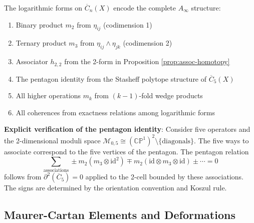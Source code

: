 \begin{theorem}\label{thm:homotopy-complete}
The logarithmic forms on $\overline{C}_n(X)$ encode the complete $A_\infty$ structure:
\begin{enumerate}
\item Binary product $m_2$ from $\eta_{ij}$ (codimension 1)
\item Ternary product $m_3$ from $\eta_{ij} \wedge \eta_{jk}$ (codimension 2)  
\item Associator $h_{2,2}$ from the 2-form in Proposition \ref{prop:assoc-homotopy}
\item The pentagon identity from the Stasheff polytope structure of $\overline{C}_5(X)$
\item All higher operations $m_k$ from $(k-1)$-fold wedge products
\item All coherences from exactness relations among logarithmic forms
\end{enumerate}

\begin{remark}\textbf{Explicit verification of the pentagon identity}: Consider five operators and the
2-dimensional moduli space $\mathcal{M}_{0,5} \cong (\mathbb{CP}^1)^2 \setminus \{\text{diagonals}\}$. 
The five ways to associate correspond to the five vertices of the pentagon. The pentagon relation
$$\sum_{\text{associations}} \pm m_2(m_3 \otimes \text{id}^2) \mp m_2(\text{id} \otimes m_3 \otimes \text{id}) \pm \cdots = 0$$
follows from $\partial^2(\overline{C}_5) = 0$ applied to the 2-cell bounded by these associations.
The signs are determined by the orientation convention and Koszul rule.\end{remark}

\end{theorem}

\subsection{Maurer-Cartan Elements and Deformations}

